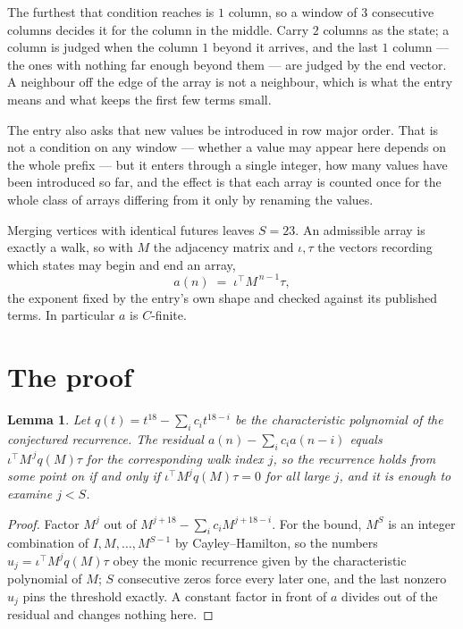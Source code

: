 \documentclass[11pt,a4paper]{article}
\theoremstyle{plain}
\newtheorem{lemma}[theorem]{Lemma}
\theoremstyle{definition}
\begin{document}
The furthest that condition reaches is $1$ column, so a window of $3$ consecutive columns decides it for the column in the middle. Carry $2$ columns as the state; a column is judged when the column $1$ beyond it arrives, and the last $1$ column --- the ones with nothing far enough beyond them --- are judged by the end vector. A neighbour off the edge of the array is not a neighbour, which is what the entry means and what keeps the first few terms small.

The entry also asks that new values be introduced in row major order. That is not a condition on any window --- whether a value may appear here depends on the whole prefix --- but it enters through a single integer, how many values have been introduced so far, and the effect is that each array is counted once for the whole class of arrays differing from it only by renaming the values.

Merging vertices with identical futures leaves $S=23$. An admissible array is exactly a walk, so with $M$ the adjacency matrix and $\iota,\tau$ the vectors recording which states may begin and end an array,
\[
a(n)\;=\;\iota^{\!\top}M^{\,n-1}\tau ,
\]
the exponent fixed by the entry's own shape and checked against its published terms. In
particular $a$ is $C$-finite.

\section{The proof}

\begin{lemma}\label{lem:crit}
Let $q(t)=t^{18}-\sum_i c_it^{18-i}$ be the characteristic polynomial of the
conjectured recurrence. The residual $a(n)-\sum_ic_ia(n-i)$ equals
$\iota^{\!\top}M^{\,j}q(M)\tau$ for the corresponding walk index $j$, so the recurrence
holds from some point on if and only if $\iota^{\!\top}M^{j}q(M)\tau=0$ for all large $j$,
and it is enough to examine $j<S$.
\end{lemma}

\begin{proof}
Factor $M^{j}$ out of $M^{j+18}-\sum_ic_iM^{j+18-i}$. For the bound, $M^{S}$
is an integer combination of $I,M,\dots,M^{S-1}$ by Cayley--Hamilton, so the numbers
$u_j=\iota^{\!\top}M^{j}q(M)\tau$ obey the monic recurrence given by the characteristic
polynomial of $M$; $S$ consecutive zeros force every later one, and the last nonzero $u_j$
pins the threshold exactly. A constant factor in front of $a$ divides out of the residual and
changes nothing here.
\end{proof}
\end{document}
